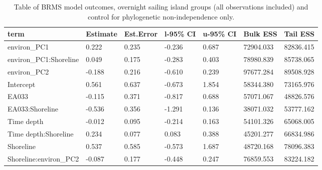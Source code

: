 \begin{table}[ht]
\centering
\begin{tabular}{p{4cm}p{1.65cm}p{1.65cm}p{1.65cm}p{1.65cm}p{1.65cm}p{1.65cm}}
  \toprule
term & Estimate & Est.Error & l-95\% CI & u-95\% CI & Bulk ESS & Tail ESS \\ 
  \midrule
environ\_PC1 & 0.222 & 0.235 & -0.236 & 0.687 & 72904.033 & 82836.415 \\ 
  environ\_PC1:Shoreline & 0.049 & 0.175 & -0.283 & 0.403 & 78980.839 & 85738.065 \\ 
  environ\_PC2 & -0.188 & 0.216 & -0.610 & 0.239 & 97677.284 & 89508.928 \\ 
  Intercept & 0.561 & 0.637 & -0.673 & 1.854 & 58344.380 & 73165.976 \\ 
  EA033 & -0.115 & 0.371 & -0.817 & 0.688 & 57071.067 & 48826.576 \\ 
  EA033:Shoreline & -0.536 & 0.356 & -1.291 & 0.136 & 38071.032 & 53777.162 \\ 
  Time depth & -0.012 & 0.095 & -0.214 & 0.163 & 54101.326 & 65068.005 \\ 
  Time depth:Shoreline & 0.234 & 0.077 & 0.083 & 0.388 & 45201.277 & 66834.986 \\ 
  Shoreline & 0.537 & 0.585 & -0.573 & 1.687 & 48720.168 & 78096.383 \\ 
  Shoreline:environ\_PC2 & -0.087 & 0.177 & -0.448 & 0.247 & 76859.553 & 83224.182 \\ 
   \bottomrule
\end{tabular}
\caption{Table of BRMS model outcomes, overnight sailing island groups (all observations included) and control for phylogenetic non-independence only.} 
\label{BRMS_effects_SBZR_control_none}
\end{table}
